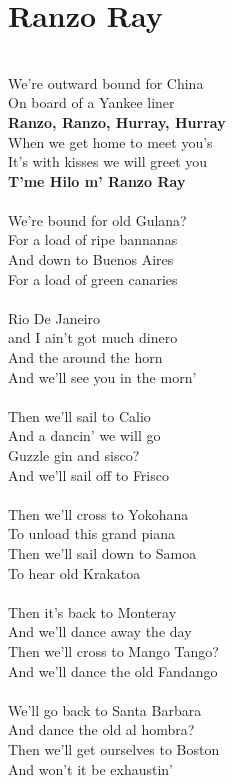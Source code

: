 \documentclass[letterpaper,9pt]{article}
\begin{document}
\section{Ranzo Ray}
\noindent
\\We’re outward bound for China 
\\On board of a Yankee liner
\\\textbf{Ranzo, Ranzo, Hurray, Hurray}
\\When we get home to meet you’s
\\It’s with kisses we will greet you
\\\textbf{T’me Hilo m’ Ranzo Ray}
\\
\\We’re bound for old Gulana?
\\For a load of ripe bannanas
\\And down to Buenos Aires
\\For a load of green canaries
\\
\\Rio De Janeiro 
\\and I ain’t got much dinero
\\And the around the horn
\\And we’ll see you in the morn’
\\
\\Then we’ll sail to Calio
\\And a dancin’ we will go
\\Guzzle gin and sisco?
\\And we’ll sail off to Frisco
\\
\\Then we’ll cross to Yokohana
\\To unload this grand piana
\\Then we’ll sail down to Samoa
\\To hear old Krakatoa
\\
\\Then it’s back to Monteray
\\And we’ll dance away the day
\\Then we’ll cross to Mango Tango?
\\And we’ll dance the old Fandango
\\
\\We’ll go back to Santa Barbara
\\And dance the old al hombra?
\\Then we’ll get ourselves to Boston
\\And won’t it be exhaustin’
\end{document}
